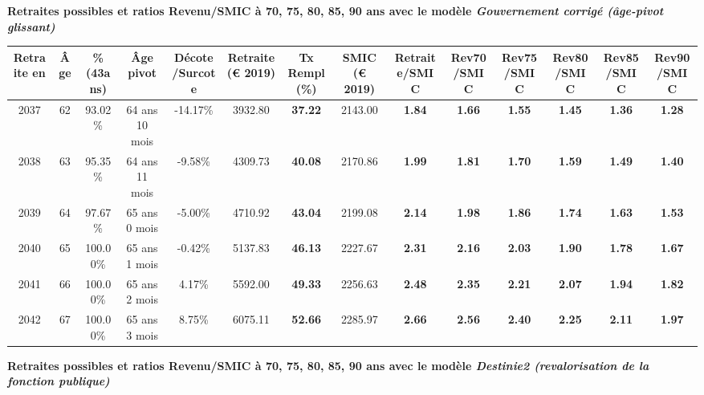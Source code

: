  \vspace{0.1cm} 
{\bf \noindent Retraites possibles et ratios Revenu/SMIC à 70, 75, 80, 85, 90 ans avec le modèle \emph{Gouvernement corrigé (âge-pivot glissant)}}  
 
\begin{adjustbox}{max width=\textwidth} 
\begin{tabular}[htb]{|c|c||c|c|c||c|c||c||c|c|c|c|c|c|} 
\hline 
 Retraite en &  Âge &  \%(43ans) &  Âge pivot &  Décote/Surcote &  Retraite (\euro{} 2019) &  Tx Rempl(\%) &  SMIC (\euro{} 2019) &  Retraite/SMIC &  Rev70/SMIC &  Rev75/SMIC &  Rev80/SMIC &  Rev85/SMIC &  Rev90/SMIC \\ 
\hline \hline 
 2037 &  62 &  93.02\% &  64 ans 10 mois &  -14.17\% &  3932.80 &  {\bf 37.22} &  2143.00 &  {\bf 1.84} &  {\bf 1.66} &  {\bf 1.55} &  {\bf 1.45} &  {\bf 1.36} &  {\bf 1.28} \\ 
\hline 
 2038 &  63 &  95.35\% &  64 ans 11 mois &  -9.58\% &  4309.73 &  {\bf 40.08} &  2170.86 &  {\bf 1.99} &  {\bf 1.81} &  {\bf 1.70} &  {\bf 1.59} &  {\bf 1.49} &  {\bf 1.40} \\ 
\hline 
 2039 &  64 &  97.67\% &  65 ans 0 mois &  -5.00\% &  4710.92 &  {\bf 43.04} &  2199.08 &  {\bf 2.14} &  {\bf 1.98} &  {\bf 1.86} &  {\bf 1.74} &  {\bf 1.63} &  {\bf 1.53} \\ 
\hline 
 2040 &  65 &  100.00\% &  65 ans 1 mois &  -0.42\% &  5137.83 &  {\bf 46.13} &  2227.67 &  {\bf 2.31} &  {\bf 2.16} &  {\bf 2.03} &  {\bf 1.90} &  {\bf 1.78} &  {\bf 1.67} \\ 
\hline 
 2041 &  66 &  100.00\% &  65 ans 2 mois &  4.17\% &  5592.00 &  {\bf 49.33} &  2256.63 &  {\bf 2.48} &  {\bf 2.35} &  {\bf 2.21} &  {\bf 2.07} &  {\bf 1.94} &  {\bf 1.82} \\ 
\hline 
 2042 &  67 &  100.00\% &  65 ans 3 mois &  8.75\% &  6075.11 &  {\bf 52.66} &  2285.97 &  {\bf 2.66} &  {\bf 2.56} &  {\bf 2.40} &  {\bf 2.25} &  {\bf 2.11} &  {\bf 1.97} \\ 
\hline 
\hline 
\end{tabular} 
\end{adjustbox} 
 
 \vspace{0.1cm} 
{\bf \noindent Retraites possibles et ratios Revenu/SMIC à 70, 75, 80, 85, 90 ans avec le modèle \emph{Destinie2 (revalorisation de la fonction publique)}}  
 
